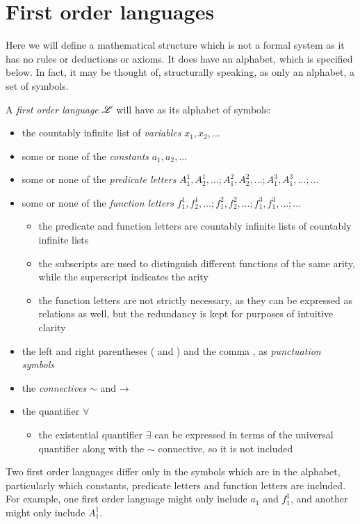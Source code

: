 \section{First order languages}

Here we will define a mathematical structure which is not a formal system as it has no rules or deductions or axioms. It does have an alphabet, which is specified below. In fact, it may be thought of, structurally speaking, as only an alphabet, a set of symbols.

A \textit{first order language} \(\mathscr{L}\) will have as its alphabet of symbols:
\begin{itemize}
  \item the countably infinite list of \textit{variables} \(x_1, x_2, \dots\)
  \item some or none of the \textit{constants} \(a_1, a_2, \dots\)
  \item some or none of the \textit{predicate letters} \(A^1_1, A^1_2, \dots; A^2_1, A^2_2, \dots; A^3_1, A^3_1, \dots; \dots\)
  \item some or none of the \textit{function letters} \(f^1_1, f^1_2, \dots; f^2_1, f^2_2, \dots; f^3_1, f^3_1, \dots; \dots\)
    \begin{itemize}
      \item the predicate and function letters are countably infinite lists of countably infinite lists
      \item the subscripts are used to distinguish different functions of the same arity, while the superscript indicates the arity
      \item the function letters are not strictly necessary, as they can be expressed as relations as well, but the redundancy is kept for purposes of intuitive clarity
    \end{itemize}
  \item the left and right parentheses ( and ) and the comma , as \textit{punctuation symbols}
  \item the \textit{connectives} \(\sim\) and \(\rightarrow\)
  \item the quantifier \(\forall\)
    \begin{itemize}
      \item the existential quantifier \(\exists\) can be expressed in terms of the universal quantifier along with the \(\sim\) connective, so it is not included
    \end{itemize}
\end{itemize}

\note{} Two first order languages differ only in the symbols which are in the alphabet, particularly which constants, predicate letters and function letters are included. For example, one first order language might only include \(a_1\) and \(f^1_1\), and another might only include \(A^1_1\).

